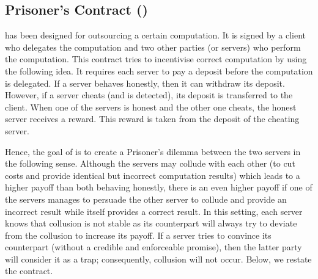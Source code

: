 

\subsection{Prisoner's Contract (\SCpc)}

\SCpc has been designed for outsourcing a certain computation. It is signed by a client who delegates the computation and two other parties  (or servers)  who perform the computation.  This contract tries to incentivise correct computation by using the following idea. It requires each server to pay a deposit before the computation is delegated. If a server behaves honestly, then it can withdraw its deposit. However, if a server cheats (and is detected), its deposit is transferred to the client. When one of the servers is honest and the other one cheats, the honest server receives a reward. This reward is taken from the deposit of the cheating server.  

Hence, the goal of \SCpc is to create a Prisoner’s dilemma between the two servers in the following sense. Although the servers may collude with each other (to cut costs and provide identical but incorrect computation results) which leads to a higher payoff than both behaving honestly,  there is an even higher payoff if one of the servers manages to persuade the other server to collude and provide an incorrect result while itself provides a correct result. In this setting, each server knows that collusion is not stable as its counterpart will always try to deviate from the collusion to increase its payoff.  If a server tries to convince its counterpart (without a credible and enforceable promise), then the latter party will consider it as a trap; consequently, collusion will not occur. Below, we restate the contract. %

